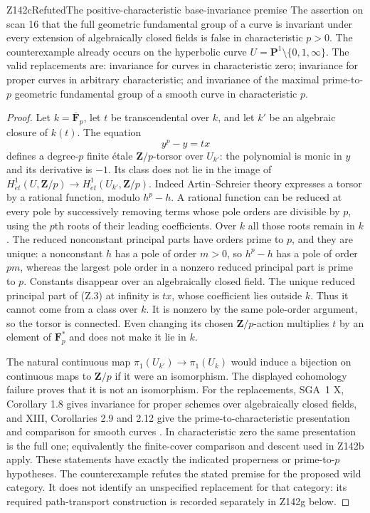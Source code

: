 \begin{result}{Z142c}{Refuted}{The positive-characteristic base-invariance premise}
The assertion on scan 16 that the full geometric fundamental group
of a curve is invariant under every extension of algebraically closed
fields is false in characteristic $p>0$. The counterexample already
occurs on the hyperbolic curve
$U=\mathbf P^1\setminus\{0,1,\infty\}$.
The valid replacements are: invariance for curves in characteristic
zero; invariance for proper curves in arbitrary characteristic; and
invariance of the maximal prime-to-$p$ geometric fundamental group
of a smooth curve in characteristic $p$.
\end{result}
\begin{proof}
Let $k=\overline{\mathbf F}_p$, let $t$ be transcendental over $k$,
and let $k'$ be an algebraic closure of $k(t)$. The equation
\[
                      y^p-y=t x                                      \tag{Z.3}
\]
defines a degree-$p$ finite \'etale $\mathbf Z/p$-torsor over $U_{k'}$:
the polynomial is monic in $y$ and its derivative is $-1$.
Its class does not lie in the image of
$H^1_{\acute et}(U,\mathbf Z/p)\to
H^1_{\acute et}(U_{k'},\mathbf Z/p)$.
Indeed Artin--Schreier theory expresses a torsor by a rational function,
modulo $h^p-h$. A rational function can be reduced at every pole by
successively removing terms whose pole orders are divisible by $p$,
using the $p$th roots of their leading coefficients. Over $k$ all those
roots remain in $k$. The reduced nonconstant principal parts have
orders prime to $p$, and they are unique: a nonconstant $h$ has a pole
of order $m>0$, so $h^p-h$ has a pole of order $pm$, whereas the largest
pole order in a nonzero reduced principal part is prime to $p$.
Constants disappear over an algebraically closed field.
The unique reduced principal part of (Z.3) at infinity is $t x$,
whose coefficient lies outside $k$. Thus it cannot come from a class
over $k$. It is nonzero by the same pole-order argument, so the torsor
is connected. Even changing its chosen $\mathbf Z/p$-action multiplies
$t$ by an element of $\mathbf F_p^*$ and does not make it lie in $k$.

The natural continuous map
$\pi_1(U_{k'})\to\pi_1(U_k)$ would induce a bijection on continuous
maps to $\mathbf Z/p$ if it were an isomorphism. The displayed
cohomology failure proves that it is not an isomorphism.
For the replacements, SGA~1 X, Corollary 1.8 gives invariance for
proper schemes over algebraically closed fields, and XIII,
Corollaries 2.9 and 2.12 give the prime-to-characteristic presentation
and comparison for smooth curves \cite{SGA1}. In characteristic zero
the same presentation is the full one; equivalently the finite-cover
comparison and descent used in Z142b apply. These statements have
exactly the indicated properness or prime-to-$p$ hypotheses.
The counterexample refutes the stated premise for the proposed wild
category. It does not identify an unspecified replacement for that
category: its required path-transport construction is recorded
separately in Z142g below.
\end{proof}

